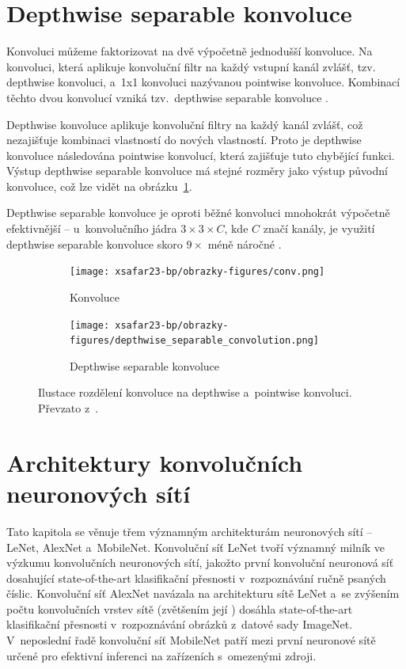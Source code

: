 \section{Depthwise separable konvoluce}

Konvoluci můžeme faktorizovat na dvě výpočetně jednodušší konvoluce. Na konvoluci, která aplikuje konvoluční filtr na každý vstupní kanál zvlášť, tzv. depthwise konvoluci, a~1x1 konvoluci nazývanou pointwise konvoluce. Kombinací těchto dvou konvolucí vzniká tzv.~depthwise separable konvoluce \cite{depthwise_conv}. 

Depthwise konvoluce aplikuje konvoluční filtry na každý kanál zvlášť, což nezajišťuje kombinaci vlastností do nových vlastností. Proto je depthwise konvoluce následována pointwise konvolucí, která zajišťuje tuto chybějící funkci. Výstup depthwise separable konvoluce má stejné rozměry jako výstup původní konvoluce, což lze vidět na obrázku~\ref{fig:conv_vs_sep}.

Depthwise separable konvoluce je oproti běžné konvoluci mnohokrát výpočetně efektivnější -- u~konvolučního jádra $3 \times 3 \times C$, kde $C$ značí kanály, je využití depthwise separable konvoluce skoro $9\times$ méně náročné \cite{howard2017mobilenets}. 

\begin{figure}[H]
\centering
\begin{subfigure}{.4\linewidth}
\centering
\texttt{[image: xsafar23-bp/obrazky-figures/conv.png]}
\caption[short]{Konvoluce}
\end{subfigure}
\begin{subfigure}{.52\linewidth}
\centering
\texttt{[image: xsafar23-bp/obrazky-figures/depthwise\_separable\_convolution.png]}
\caption[short]{Depthwise separable konvoluce}
\end{subfigure}
\caption{Ilustace rozdělení konvoluce na depthwise a~pointwise konvoluci. Převzato z~\cite{depthwise_conv}.}
    \label{fig:conv_vs_sep}
\end{figure}

\section{Architektury konvolučních neuronových sítí}

Tato kapitola se věnuje třem významným architekturám neuronových sítí -- LeNet, AlexNet a~MobileNet. Konvoluční síť LeNet tvoří významný milník ve výzkumu konvolučních neuronových sítí, jakožto první konvoluční neuronová síť dosahující state-of-the-art klasifikační přesnosti v~rozpoznávání ručně psaných číslic. Konvoluční síť AlexNet navázala na architekturu sítě LeNet a~se zvýšením počtu konvolučních vrstev sítě (zvětšením její ) dosáhla state-of-the-art klasifikační přesnosti v~rozpoznávání obrázků z~datové sady ImageNet. V~neposlední řadě konvoluční síť MobileNet patří mezi první neuronové sítě určené pro efektivní inferenci na zařízeních s~omezenými zdroji.

